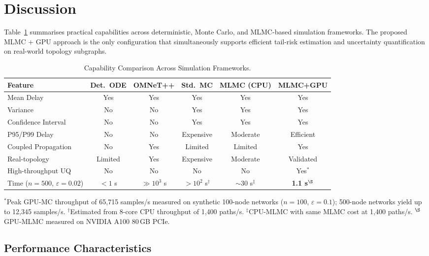\documentclass{ieeeaccess}
\begin{document}
\section{Discussion}
\label{sec:discussion}

Table~\ref{tab:capability} summarises practical capabilities across deterministic,
Monte Carlo, and MLMC-based simulation frameworks. The proposed MLMC + GPU approach is the only
configuration that simultaneously supports efficient tail-risk estimation and uncertainty
quantification on real-world topology subgraphs.

\begin{table}[!t]
\caption{Capability Comparison Across Simulation Frameworks.}
\label{tab:capability}
\centering\small
\begin{tabular*}{\textwidth}{@{\extracolsep\fill}p{2.8cm} c c c c c@{}}
\toprule
Feature & Det.\ ODE & OMNeT++ & Std.\ MC & MLMC (CPU) & MLMC+GPU \\
\midrule
Mean Delay & Yes & Yes & Yes & Yes & Yes \\
Variance & No & No & Yes & Yes & Yes \\
Confidence Interval & No & No & Yes & Yes & Yes \\
P95/P99 Delay & No & No & Expensive & Moderate & Efficient \\
Coupled Propagation & No & Yes & Limited & Limited & Yes \\
Real-topology & Limited & Yes & Expensive & Moderate & Validated \\
High-throughput UQ & No & No & No & No & Yes$^*$ \\
\midrule
Time ($n=500$, $\varepsilon=0.02$) & $<1$ s & $\gg10^3$ s & $>10^2$ s$^\dagger$ &
$\sim30$ s$^\ddagger$ & \textbf{1.1 s}$^\S$ \\
\bottomrule
\end{tabular*}
\vspace{2pt}
\footnotesize
$^*$Peak GPU-MC throughput of 65,715 samples/s measured on synthetic 100-node networks
($n=100$, $\varepsilon=0.1$); 500-node networks yield up to 12,345 samples/s.
$^\dagger$Estimated from 8-core CPU throughput of 1,400 paths/s.
$^\ddagger$CPU-MLMC with same MLMC cost at 1,400 paths/s.
$^\S$GPU-MLMC measured on NVIDIA A100 80\,GB PCIe.
\end{table}

\subsection{Performance Characteristics}
\label{subsec:multigpu_scaling}
\end{document}
